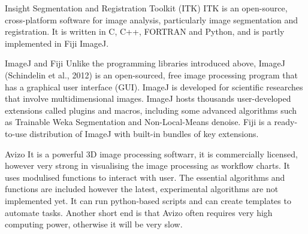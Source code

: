 Insight Segmentation and Registration Toolkit (ITK) 
ITK is an open-source, cross-platform software for image analysis, particularly image segmentation and registration. It is written in C, C++, FORTRAN and Python, and is partly implemented in Fiji ImageJ. 

ImageJ and Fiji 
Unlike the programming libraries introduced above, ImageJ (Schindelin et al., 2012) is an open-sourced, free image processing program that has a graphical user interface (GUI). ImageJ is developed for scientific researches that involve multidimensional images. ImageJ hosts thousands user-developed extensions called plugins and macros, including some advanced algorithms such as Trainable Weka Segmentation and Non-Local-Means denoise. Fiji is a ready-to-use distribution of ImageJ with built-in bundles of key extensions. 

Avizo
It is a powerful 3D image processing softwarr, it is commercially licensed, however very strong in visualising the image processing as workflow charts. It uses modulised functions to interact with user. The essential algorithms and functions are included however the latest, experimental algorithms are not implemented yet. It can run python-based scripts and can create templates to automate tasks. Another short end is that Avizo often requires very high computing power, otherwise it will be very slow.


